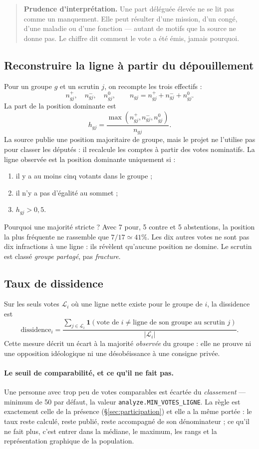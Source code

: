 \documentclass[11pt,a4paper]{article}
\newcommand{\ind}{\mathbf{1}}
\newcommand{\code}[1]{\texttt{#1}}
\newcommand{\prudence}[1]{\begin{quote}\small\color{red!55!black}\textbf{Prudence d'interprétation.} #1\end{quote}}
\begin{document}
\prudence{Une part déléguée élevée ne se lit pas comme un manquement. Elle peut
résulter d'une mission, d'un congé, d'une maladie ou d'une fonction — autant de
motifs que la source ne donne pas. Le chiffre dit comment le vote a été émis,
jamais pourquoi.}

\subsection{Reconstruire la ligne à partir du dépouillement}

Pour un groupe $g$ et un scrutin $j$, on recompte les trois effectifs :
\[
 n^+_{gj},\quad n^-_{gj},\quad n^0_{gj},\qquad
 n_{gj}=n^+_{gj}+n^-_{gj}+n^0_{gj}.
\]
La part de la position dominante est
\[
 h_{gj}=\frac{\max(n^+_{gj},n^-_{gj},n^0_{gj})}{n_{gj}}.
\]
La source publie une position majoritaire de groupe, mais le projet ne l'utilise
pas pour classer les députés : il recalcule les comptes à partir des votes
nominatifs. La ligne observée est la position dominante uniquement si :

\begin{enumerate}
  \item il y a au moins cinq votants dans le groupe ;
  \item il n'y a pas d'égalité au sommet ;
  \item $h_{gj}>0{,}5$.
\end{enumerate}

Pourquoi une majorité stricte ? Avec 7 pour, 5 contre et 5 abstentions, la
position la plus fréquente ne rassemble que $7/17\simeq41\%$. Les dix autres
votes ne sont pas dix infractions à une ligne : ils révèlent qu'aucune position
ne domine. Le scrutin est classé \emph{groupe partagé}, pas \emph{fracture}.

\subsection{Taux de dissidence}
\label{sec:dissidence}

Sur les seuls votes $\mathcal L_i$ où une ligne nette existe pour le groupe de
$i$, la dissidence est
\[
 \mathrm{dissidence}_i=
 \frac{\sum_{j\in\mathcal L_i}\ind(\text{vote de $i$}\neq
 \text{ligne de son groupe au scrutin $j$})}{|\mathcal L_i|}.
\]
Cette mesure décrit un écart à la majorité \emph{observée} du groupe : elle ne
prouve ni une opposition idéologique ni une désobéissance à une consigne privée.

\paragraph{Le seuil de comparabilité, et ce qu'il ne fait pas.} Une personne
avec trop peu de votes comparables est écartée du \emph{classement} — minimum de
50 par défaut, la valeur \code{analyze.MIN\_VOTES\_LIGNE}. La règle est
exactement celle de la présence (§\ref{sec:participation}) et elle a la même
portée : le taux reste calculé, reste publié, reste accompagné de son
dénominateur ; ce qu'il ne fait plus, c'est entrer dans la médiane, le maximum,
les rangs et la représentation graphique de la population.
\end{document}
